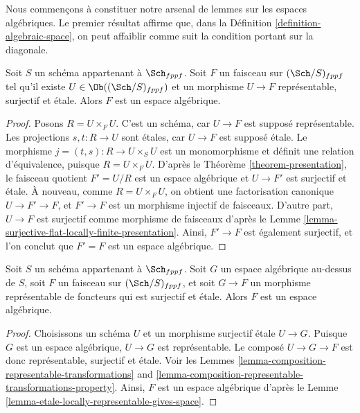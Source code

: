 \noindent
Nous commençons à constituer notre arsenal de lemmes sur les espaces algébriques.
Le premier résultat affirme que, dans la Définition \ref{definition-algebraic-space},
on peut affaiblir comme suit la condition portant sur la diagonale.

\begin{lemma}
\label{lemma-etale-locally-representable-gives-space}
Soit $S$ un schéma appartenant à $\Sch_{fppf}$.
Soit $F$ un faisceau sur $(\Sch/S)_{fppf}$
tel qu'il existe $U \in \Ob((\Sch/S)_{fppf})$ et un morphisme
$U \to F$ représentable, surjectif et \'etale.
Alors $F$ est un espace algébrique.
\end{lemma}

\begin{proof}
Posons $R = U \times_F U$. C'est un schéma, car $U \to F$ est supposé représentable.
Les projections $s, t : R \to U$ sont \'etales, car $U \to F$ est supposé \'etale.
Le morphisme $j = (t, s) : R \to U \times_S U$ est un monomorphisme et définit une relation
d'équivalence, puisque $R = U \times_F U$. D'après le Théorème \ref{theorem-presentation},
le faisceau quotient $F' = U/R$ est un espace algébrique et $U \to F'$
est surjectif et \'etale. À nouveau, comme $R = U \times_F U$, on obtient
une factorisation canonique $U \to F' \to F$, et $F' \to F$ est un morphisme injectif
de faisceaux. D'autre part, $U \to F$ est surjectif comme morphisme
de faisceaux d'après le Lemme \ref{lemma-surjective-flat-locally-finite-presentation}.
Ainsi, $F' \to F$ est également surjectif, et l'on conclut que $F' = F$ est un
espace algébrique.
\end{proof}

\begin{lemma}
\label{lemma-etale-locally-representable-by-space-gives-space}
Soit $S$ un schéma appartenant à $\Sch_{fppf}$. Soit $G$ un espace
algébrique au-dessus de $S$, soit $F$ un faisceau sur $(\Sch/S)_{fppf}$, et soit
$G \to F$ un morphisme représentable de foncteurs qui est
surjectif et \'etale. Alors $F$ est un espace algébrique.
\end{lemma}

\begin{proof}
Choisissons un schéma $U$ et un morphisme surjectif \'etale $U \to G$.
Puisque $G$ est un espace algébrique, $U \to G$ est représentable.
Le composé $U \to G \to F$ est donc représentable,
surjectif et \'etale. Voir les Lemmes
\ref{lemma-composition-representable-transformations} and
\ref{lemma-composition-representable-transformations-property}.
Ainsi, $F$ est un espace algébrique d'après le
Lemme \ref{lemma-etale-locally-representable-gives-space}.
\end{proof}

